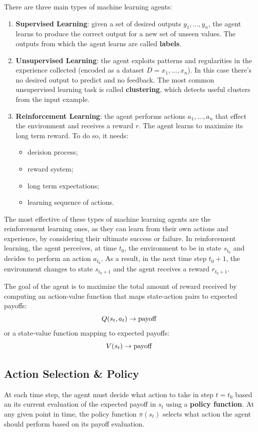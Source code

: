 \documentclass{article}
\begin{document}
There are three main types of machine learning agents:
\begin{enumerate}
    \item \textbf{Supervised Learning}: given a set of desired outputs $y_1, ..., y_n$, the agent learns to produce the correct output for a new set of unseen values. The outputs from which the agent learns are called \textbf{labels}.
    \item \textbf{Unsupervised Learning}: the agent exploits patterns and regularities in the experience collected (encoded as a dataset $D = x_1, ..., x_n$). In this case there's no desired output to predict and no feedback. The most common unsupervised learning task is called \textbf{clustering}, which detects useful clusters from the input example.
    \item \textbf{Reinforcement Learning}: the agent performs actions $a_1, ..., a_n$ that effect the environment and receives a reward $r$. The agent learns to maximize its long term reward. To do so, it needs:
    \begin{itemize}
        \item decision process;
        \item reward system;
        \item long term expectations;
        \item learning sequence of actions.
    \end{itemize}
\end{enumerate}

The most effective of these types of machine learning agents are the reinforcement learning ones, as they can learn from their own actions and experience, by considering their ultimate success or failure. In reinforcement learning, the agent perceives, at time $t_0$, the environment to be in state $s_{t_0}$ and decides to perform an action $a_{t_0}$. As a result, in the next time step $t_0+1$, the environment changes to state $s_{t_0+1}$ and the agent receives a reward $r_{t_0+1}$. 

The goal of the agent is to maximize the total amount of reward received by computing an action-value function that maps state-action pairs to expected payoffs:
\[Q(s_t, a_t) \to \textnormal{payoff}\]
or a state-value function mapping to expected payoffs:
\[V(s_t) \to \textnormal{payoff}\]

\subsection{Action Selection \& Policy}
At each time step, the agent must decide what action to take in step $t=t_0$ based an its current evaluation of the expected payoff in $s_t$ using a \textbf{policy function}. At any given point in time, the policy function $\pi(s_t)$ selects what action the agent should perform based on its payoff evaluation.
\end{document}

